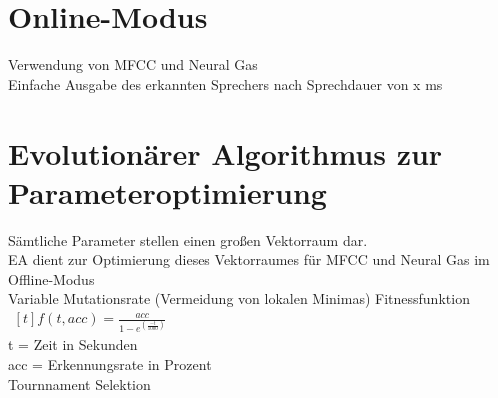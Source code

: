 \section{Online-Modus}
Verwendung von MFCC und Neural Gas\\
Einfache Ausgabe des erkannten Sprechers nach Sprechdauer von x ms

\section{Evolutionärer Algorithmus zur Parameteroptimierung}
Sämtliche Parameter stellen einen großen Vektorraum dar.\\
EA dient zur Optimierung dieses Vektorraumes für MFCC und Neural Gas im Offline-Modus\\
Variable Mutationsrate (Vermeidung von lokalen Minimas)
Fitnessfunktion $\begin{aligned}[t]f(t,acc) = \frac{acc}{1 - e^{\left(\frac{-t}{1000}\right)}}\end{aligned}$\\
t = Zeit in Sekunden\\
acc = Erkennungsrate in Prozent\\
Tournnament Selektion
